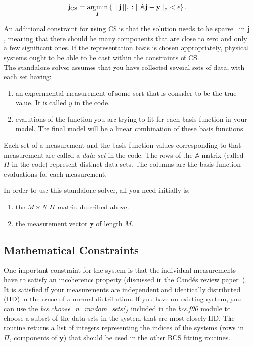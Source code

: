 \documentclass[paper=a4, fontsize=11pt]{scrartcl} %
\newcommand{\vectornorm}[1]{\left|\left|\,#1\,\right|\right|}
\newcommand{\argmin}{\operatornamewithlimits{argmin}}
\numberwithin{equation}{section} %
\numberwithin{figure}{section} %
\numberwithin{table}{section} %
\begin{document}
\begin{equation}
\label{eq:Ell1Norm}
\mathbf{j}_{\textrm{CS}} = \argmin_{\mathbf{j}} \left\{\;
  \vectornorm{\mathbf{j}}_1 : \vectornorm{\mathbb{A}\mathbf{j}-\mathbf{y}}_2 <
  \epsilon \right\}.
\end{equation}

An additional constraint for using CS is that the solution needs to be
sparse~\cite{Candes:2006es} in $\mathbf{j}$, meaning that there should be many components
that are close to zero and only a few significant ones. If the
representation basis is chosen appropriately, physical systems ought
to be able to be cast within the constraints of CS.\\

The standalone solver assumes that you have collected several sets of
data, with each set having:

\begin{enumerate}
\item\label{item:MeasurementVector} an experimental measurement of
  some sort that is consider to be the true value. It is called
  $y$ in the code.
\item\label{item:BasisFunctionEvaluations} evalutions of the function
  you are trying to fit for each basis function in your model. The
  final model will be a linear combination of these basis functions.
\end{enumerate}

Each set of a measurement and the basis function values corresponding
to that measurement are called a \emph{data set} in the code. The rows
of the $\mathbb{A}$ matrix (called $\Pi$ in the code) represent
distinct data sets. The columns are the basis function evaluations for
each measurement.

In order to use this standalone solver, all you need initially is:

\begin{enumerate}
\item\label{item:PiMatrix} the $M \times N$ $\Pi$ matrix described above.
\item\label{item:YVector} the measurement vector $\mathbf{y}$ of
  length $M$.
\end{enumerate}

\subsection{Mathematical Constraints}

One important constraint for the system is that the individual
measurements have to satisfy an incoherence property (discussed in the
Cand\'es review paper~\cite{Candes:2008hb,Candes:2006es}). It is
satisfied if your measurements are independent and identically
distributed (IID) in the sense of a normal distribution. If you have an existing system, you can use the
\emph{bcs.choose\_n\_random\_sets()} included in the \emph{bcs.f90}
module to choose a subset of the data sets in the system that are most
closely IID. The routine returns a list of integers representing the
indices of the systems (rows in $\Pi$, components of $\mathbf{y}$)
that should be used in the other BCS fitting routines.\\
\end{document}

